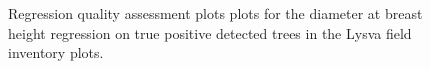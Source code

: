 \begin{figure}
\caption[Regression quality assessment plots plots for the dbh regression on true positive detected trees.]{\label{fig-lysva-regression-metrics}Regression quality
assessment plots plots for the diameter at breast height regression on
true positive detected trees in the Lysva field inventory plots.}
\end{figure}
